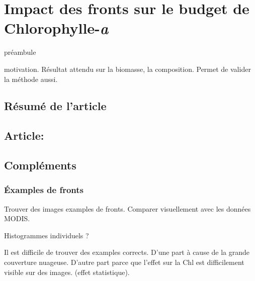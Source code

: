 \documentclass[index]{subfiles}
\begin{document}
\chapter{Impact des fronts sur le budget de Chlorophylle-\emph{a}}
\label{chp:res-chl}

\tocsubfile

préambule

motivation.
Résultat attendu sur la biomasse, la composition.
Permet de valider la méthode aussi.

\section{Résumé de l'article}
\label{sec:resume-article}

\section{Article: \articleTitle{}}
\label{sec:article-bg}

\section{Compléments}
\label{sec:complements-chl}

\subsection{Éxamples de fronts}
\label{sec:examples-fronts}

Trouver des images examples de fronts.
Comparer visuellement avec les données MODIS.

Histogrammes individuels ?

Il est difficile de trouver des examples corrects.
D'une part à cause de la grande couverture nuageuse.
D'autre part parce que l'effet sur la Chl est difficilement visible sur des images. (effet statistique).
\end{document}
